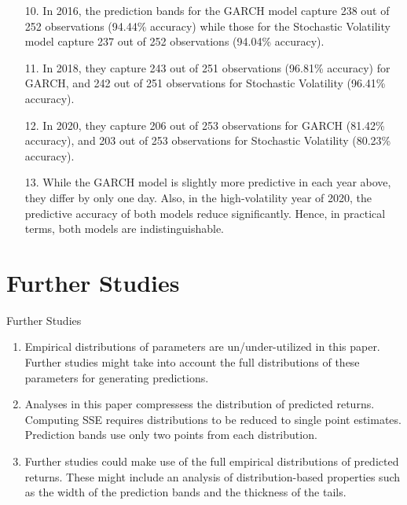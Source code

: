 \documentclass[11pt]{beamer}
\begin{document}
\begin{frame}
\begin{enumerate}
\item[10.] In 2016, the prediction bands for the GARCH model capture 238 out of 252 observations (94.44\% accuracy) while those for the Stochastic Volatility model capture 237 out of 252 observations (94.04\% accuracy).

\item[11.] In 2018, they capture 243 out of 251 observations (96.81\% accuracy) for GARCH, and 242 out of 251 observations for Stochastic Volatility (96.41\% accuracy).

\item[12.] In 2020, they capture 206 out of 253 observations for GARCH (81.42\% accuracy), and 203 out of 253 observations for Stochastic Volatility (80.23\% accuracy).

\item[13.] While the GARCH model is slightly more predictive in each year above, they differ by only one day. Also, in the high-volatility year of 2020, the predictive accuracy of both models reduce significantly. Hence, in practical terms, both models are indistinguishable.
\end{enumerate}
\end{frame}


\section{Further Studies}
\begin{frame}{Further Studies}

\begin{enumerate}
\item Empirical distributions of parameters are un/under-utilized in this paper. Further studies might take into account the full distributions of these parameters for generating predictions. 
\item Analyses in this paper compressess the distribution of predicted returns. Computing SSE requires distributions to be reduced to single point estimates. Prediction bands use only two points from each distribution. 
\item Further studies could make use of the full empirical distributions of predicted returns. These might include an analysis of distribution-based properties such as the width of the prediction bands and the thickness of the tails. 
\end{enumerate}

\end{frame}
\end{document}
